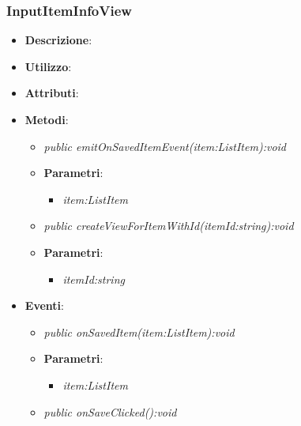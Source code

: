 \subsubsection{InputItemInfoView}
\begin{itemize}
\item \textbf{Descrizione}: 
\item \textbf{Utilizzo}:
\item \textbf{Attributi}:
\item \textbf{Metodi}:
	\begin{itemize}
	\item \textit{public emitOnSavedItemEvent(item:ListItem):void}\\

			\item{\textbf{Parametri}: \begin{itemize}
			\item \textit{item:ListItem}\\

			\end{itemize}}
	\item \textit{public createViewForItemWithId(itemId:string):void}\\

			\item{\textbf{Parametri}: \begin{itemize}
			\item \textit{itemId:string}\\
			\end{itemize}}

	\end{itemize}
\item \textbf{Eventi}:
\begin{itemize}
\item \textit{public onSavedItem(item:ListItem):void}\\

			\item{\textbf{Parametri}: \begin{itemize}
			\item \textit{item:ListItem}\\
			
\end{itemize}}
\item \textit{public onSaveClicked():void}\\

\end{itemize}
\end{itemize}

